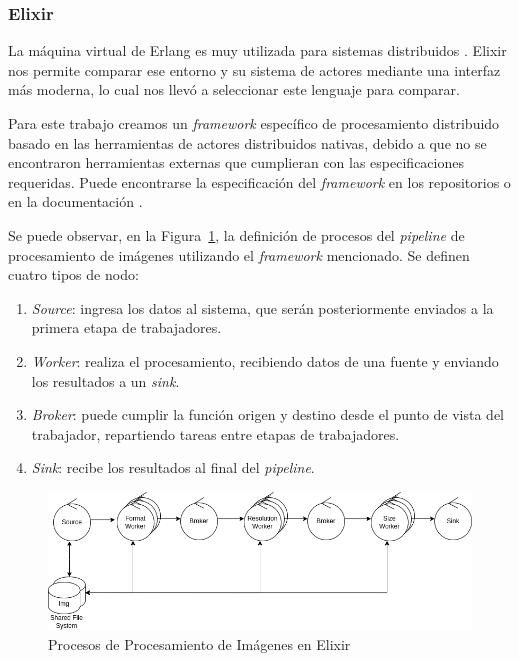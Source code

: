 \documentclass[11pt]{article}
\let\Oldsubsubsection\subsubsection
\renewcommand{\subsubsection}{\FloatBarrier\Oldsubsubsection}
\newcommand{\english}[1]{\textit{#1}}
\begin{document}
\subsubsection{Elixir}

La máquina virtual de Erlang es muy utilizada para sistemas distribuidos \cite{elx:ex:companies} \cite{scala:lib:rabbit}. Elixir nos permite comparar ese entorno y su sistema de actores mediante una interfaz más moderna, lo cual nos llevó a seleccionar este lenguaje para comparar.

Para este trabajo creamos un \english{framework} específico de procesamiento distribuido basado en las herramientas de actores distribuidos nativas, debido a que no se encontraron herramientas externas que cumplieran con las especificaciones requeridas. Puede encontrarse la especificación del \english{framework} en los repositorios o en la documentación \cite{repos:docs}.

Se puede observar, en la Figura~\ref{fig:elx:image_processing_framework}, la definición de procesos del \english{pipeline} de procesamiento de imágenes utilizando el \english{framework} mencionado. Se definen cuatro tipos de nodo:
\begin{enumerate}
    \item \english{Source}: ingresa los datos al sistema, que serán posteriormente enviados a la primera etapa de trabajadores.
    \item \english{Worker}: realiza el procesamiento, recibiendo datos de una fuente y enviando los resultados a un \english{sink}.
    \item \english{Broker}: puede cumplir la función origen y destino desde el punto de vista del trabajador, repartiendo tareas entre etapas de trabajadores.
    \item  \english{Sink}: recibe los resultados al final del \english{pipeline}.
\end{enumerate}

\begin{figure}[ht]
    \centering
    \includegraphics[scale=0.4]{resources/distributed_systems/elixir/image_processing_framework.png}
    \caption{Procesos de Procesamiento de Imágenes en Elixir}
    \label{fig:elx:image_processing_framework}
\end{figure}
\end{document}
